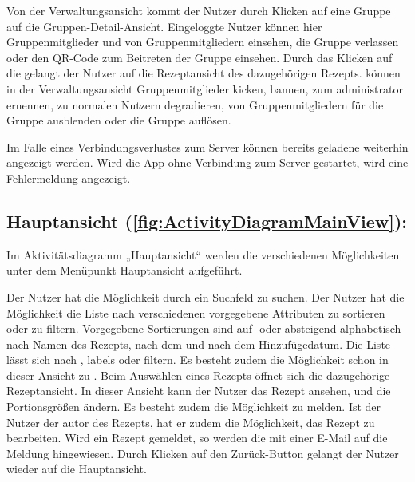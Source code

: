 \documentclass[parskip=full]{scrartcl}
\begin{document}
Von der Verwaltungsansicht kommt der Nutzer durch Klicken auf eine Gruppe auf die Gruppen-Detail-Ansicht.
Eingeloggte Nutzer können hier Gruppenmitglieder und  von Gruppenmitgliedern einsehen, die Gruppe verlassen oder den QR-Code zum Beitreten der Gruppe einsehen.
Durch das Klicken auf die  gelangt der Nutzer auf die Rezeptansicht des dazugehörigen Rezepts.
 können in der Verwaltungsansicht Gruppenmitglieder \gls{kicken}, \gls{bannen}, zum \gls{administrator} ernennen,  zu normalen Nutzern degradieren,  von Gruppenmitgliedern für die Gruppe \gls{ausblenden} oder die Gruppe auflösen.\par

Im Falle eines Verbindungsverlustes zum Server können bereits geladene  weiterhin angezeigt werden. Wird die App ohne Verbindung zum Server gestartet, wird eine Fehlermeldung angezeigt.

\subsection{Hauptansicht (\autoref{fig:ActivityDiagramMainView}):}

Im Aktivitätsdiagramm „Hauptansicht“
werden die verschiedenen Möglichkeiten unter dem Menüpunkt Hauptansicht aufgeführt.


Der Nutzer hat die Möglichkeit  durch ein Suchfeld zu suchen.
Der Nutzer hat die Möglichkeit die Liste nach verschiedenen vorgegebene Attributen zu sortieren oder zu filtern.
Vorgegebene Sortierungen sind auf- oder absteigend alphabetisch nach Namen des Rezepts, nach dem  und nach dem Hinzufügedatum.
Die Liste lässt sich nach , \gls{labels} oder  filtern.
Es besteht zudem die Möglichkeit  schon in dieser Ansicht zu .\newline
Beim Auswählen eines Rezepts öffnet sich die dazugehörige Rezeptansicht.
In dieser Ansicht kann der Nutzer das Rezept ansehen,  und die Portionsgrößen ändern.
Es besteht zudem die Möglichkeit  zu melden.
Ist der Nutzer der \gls{autor} des Rezepts, hat er zudem die Möglichkeit, das Rezept zu bearbeiten.
Wird ein Rezept gemeldet, so werden die  mit einer E-Mail auf die Meldung hingewiesen.\newline
Durch Klicken auf den Zurück-Button gelangt der Nutzer wieder auf die Hauptansicht.\par
\end{document}
